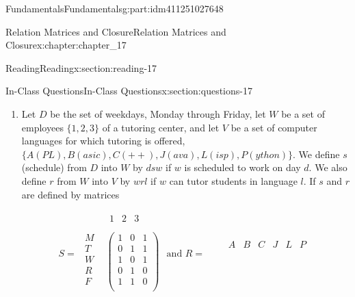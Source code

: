 \documentclass[oneside,10pt,]{book}
\numberwithin{equation}{section}
\begin{document}
\begin{partptx}{Fundamentals}{}{Fundamentals}{}{}{g:part:idm411251027648}
\begin{chapterptx}{Relation Matrices and Closure}{}{Relation Matrices and Closure}{}{}{x:chapter:chapter_17}
\begin{sectionptx}{Reading}{}{Reading}{}{}{x:section:reading-17}
\begin{enumerate}[label=(\alph*)]
\end{enumerate}
%
\end{sectionptx}
%
%
\typeout{************************************************}
\typeout{************************************************}
%
\begin{sectionptx}{In-Class Questions}{}{In-Class Questions}{}{}{x:section:questions-17}
%
\begin{enumerate}[label=\arabic*.]
\item{}Let \(D\) be the set of weekdays, Monday through Friday, let \(W\) be a set of employees \(\{1, 2, 3\}\) of a tutoring center, and let \(V\) be a set of computer languages for which tutoring is offered,  \(\{A(PL), B(asic), C(++), J(ava), L(isp), P(ython)\}\). We define \(s\) (schedule) from \(D\) into \(W\) by \(d s w\) if \(w\) is scheduled to work on day \(d\). We also define \(r\) from \(W\) into \(V\) by \(w r l\) if \(w\) can tutor students in language \(l\). If \(s\) and \(r\) are defined by matrices%
\par
%
\begin{equation*}
S = 
\begin{array}{cc}
& 
\begin{array}{ccc}
1 & 2 & 3 \\
\end{array}
\\
\begin{array}{c}
M \\
T \\
W \\
R \\
F \\
\end{array}
& 
\left(
\begin{array}{ccc}
1 & 0 & 1 \\
0 & 1 & 1 \\
1 & 0 & 1 \\
0 & 1 & 0 \\
1 & 1 & 0 \\
\end{array}
\right) \\
\end{array}
\textrm{ and }R=
\begin{array}{cc}
& 
\begin{array}{cccccc}
A & B & C & J & L & P \\
\end{array}
\\
\begin{array}{c}

\end{array}
\end{array}
\end{equation*}
\end{enumerate}
\end{sectionptx}
\end{chapterptx}
\end{partptx}
\end{document}
